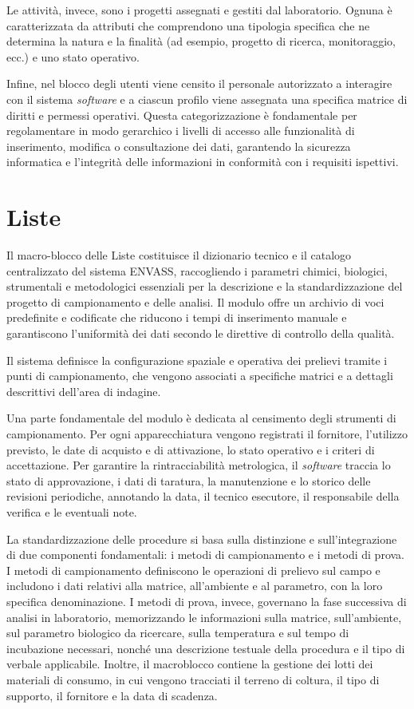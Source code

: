 Le attività, invece, sono i progetti assegnati e gestiti dal laboratorio. Ognuna è caratterizzata da attributi che comprendono una tipologia specifica che ne determina la natura e la finalità (ad esempio, progetto di ricerca, monitoraggio, ecc.) e uno stato operativo.

Infine, nel blocco degli utenti viene censito il personale autorizzato a interagire con il sistema \textit{software} e a ciascun profilo viene assegnata una specifica matrice di diritti e permessi operativi. Questa categorizzazione è fondamentale per regolamentare in modo gerarchico i livelli di accesso alle funzionalità di inserimento, modifica o consultazione dei dati, garantendo la sicurezza informatica e l'integrità delle informazioni in conformità con i requisiti ispettivi. 

\section{Liste}
Il macro-blocco delle Liste costituisce il dizionario tecnico e il catalogo centralizzato del sistema ENVASS, raccogliendo i parametri chimici, biologici, strumentali e metodologici essenziali per la
descrizione e la standardizzazione del progetto di campionamento e delle
analisi. Il modulo offre un archivio di voci predefinite e codificate che
riducono i tempi di inserimento manuale e garantiscono l'uniformità dei dati
secondo le direttive di controllo della qualità.

Il sistema definisce la configurazione spaziale e operativa
dei prelievi tramite i punti di campionamento, che vengono associati a
specifiche matrici e a dettagli descrittivi dell'area di indagine.

Una parte fondamentale del modulo è dedicata al censimento
degli strumenti di campionamento. Per ogni apparecchiatura vengono registrati
il fornitore, l'utilizzo previsto, le date di acquisto e di attivazione, lo
stato operativo e i criteri di accettazione. Per garantire la rintracciabilità
metrologica, il \textit{software} traccia lo stato di approvazione, i dati di taratura,
la manutenzione e lo storico delle revisioni periodiche, annotando la data, il
tecnico esecutore, il responsabile della verifica e le eventuali note.

La standardizzazione delle procedure si basa sulla
distinzione e sull'integrazione di due componenti fondamentali: i metodi di
campionamento e i metodi di prova. I metodi di campionamento definiscono le
operazioni di prelievo sul campo e includono i dati relativi alla matrice,
all'ambiente e al parametro, con la loro specifica denominazione. I metodi di
prova, invece, governano la fase successiva di analisi in laboratorio,
memorizzando le informazioni sulla matrice, sull'ambiente, sul parametro
biologico da ricercare, sulla temperatura e sul tempo di incubazione necessari,
nonché una descrizione testuale della procedura e il tipo di verbale
applicabile. Inoltre, il macroblocco contiene la gestione dei lotti dei
materiali di consumo, in cui vengono tracciati il terreno di coltura, il tipo
di supporto, il fornitore e la data di scadenza.

